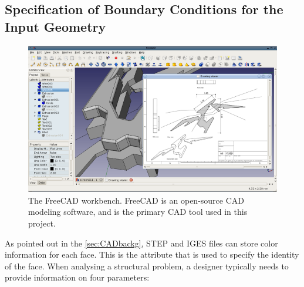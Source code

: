 \subsection{Specification of Boundary Conditions for the Input Geometry}
\label{sec: GeomCreation}

\begin{figure}
\centering
  \includegraphics[scale=0.75]{Pictures/CADToVoxel/FreeCAD.png}
\caption{The FreeCAD workbench. FreeCAD is an open-source CAD modeling software, and is the primary CAD tool used in this project.\cite{FreeCAD}}
\label{fig: freeCAD}
\end{figure}

As pointed out in the \ref{sec:CADbackg}, STEP and IGES files can store color information for each face. This is the attribute that is used to specify the identity of the face. When analysing a structural problem, a designer typically needs to provide information on four parameters:

